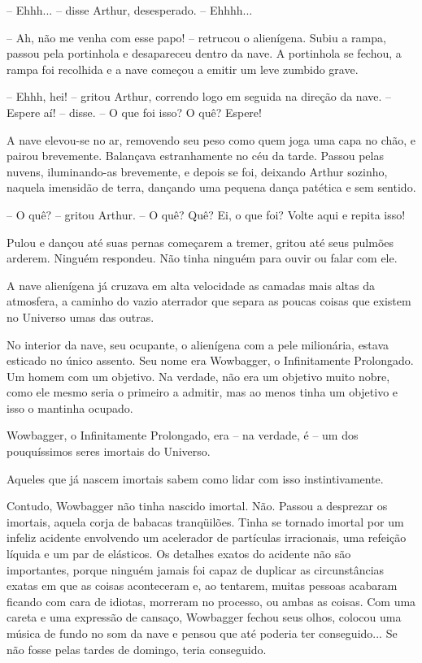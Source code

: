 \documentclass[eps,11pt]{book}
\begin{document}
-- Ehhh... -- disse Arthur, desesperado. -- Ehhhh...

-- Ah, não me venha com esse papo! -- retrucou o alienígena. Subiu a rampa, passou pela portinhola e desapareceu dentro da nave. A portinhola se fechou, a rampa foi recolhida e a nave começou a emitir um leve zumbido grave.

-- Ehhh, hei! -- gritou Arthur, correndo logo em seguida na direção da nave. -- Espere aí! -- disse. -- O que foi isso? O quê? Espere!

A nave elevou-se no ar, removendo seu peso como quem joga uma capa no chão, e pairou brevemente. Balançava estranhamente no céu da tarde. Passou pelas nuvens, iluminando-as brevemente, e depois se foi, deixando Arthur sozinho, naquela imensidão de terra, dançando uma pequena dança patética e sem sentido.

-- O quê? -- gritou Arthur. -- O quê? Quê? Ei, o que foi? Volte aqui e repita isso!

Pulou e dançou até suas pernas começarem a tremer, gritou até seus pulmões arderem. Ninguém respondeu. Não tinha ninguém para ouvir ou falar com ele.

A nave alienígena já cruzava em alta velocidade as camadas mais altas da atmosfera, a caminho do vazio aterrador que separa as poucas coisas que existem no Universo umas das outras.

No interior da nave, seu ocupante, o alienígena com a pele milionária, estava esticado no único assento. Seu nome era Wowbagger, o Infinitamente Prolongado. Um homem com um objetivo. Na verdade, não era um objetivo muito nobre, como ele mesmo seria o primeiro a admitir, mas ao menos tinha um objetivo e isso o mantinha ocupado.

Wowbagger, o Infinitamente Prolongado, era -- na verdade, é -- um dos pouquíssimos seres imortais do Universo.

Aqueles que já nascem imortais sabem como lidar com isso instintivamente.

Contudo, Wowbagger não tinha nascido imortal. Não. Passou a desprezar os imortais, aquela corja de babacas tranqüilões. Tinha se tornado imortal por um infeliz acidente envolvendo um acelerador de partículas irracionais, uma refeição líquida e um par de elásticos. Os detalhes exatos do acidente não são importantes, porque ninguém jamais foi capaz de duplicar as circunstâncias exatas em que as coisas aconteceram e, ao tentarem, muitas pessoas acabaram ficando com cara de idiotas, morreram no processo, ou ambas as coisas.
Com uma careta e uma expressão de cansaço, Wowbagger fechou seus olhos, colocou uma música de fundo no som da nave e pensou que até poderia ter conseguido... Se não fosse pelas tardes de domingo, teria conseguido.
\end{document}
